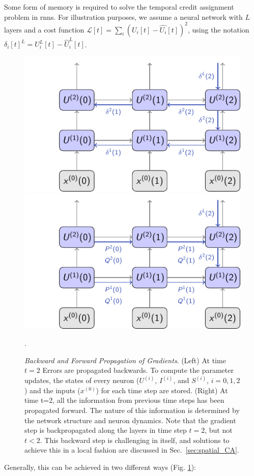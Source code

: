 \documentclass[journal,onecolumn,11pt]{IEEEtran}
\begin{document}
\label{sec:temporal_credit_assignment}
Some form of memory is required to solve the temporal credit assignment problem in \glspl{rnn}. 
For illustration purposes, we assume a neural network with $L$ layers and a cost function $\mathcal{L}[t] = \sum_i (U_i[t]-\hat{U_i}[t])^2$, using the notation $\delta_i[t]^{L} = U_i^L[t]-\hat{U}_i^L[t]$. 
%
\begin{figure}[htbp]
    \centering
    \includegraphics[width=.4\textwidth]{figures/diagram_bp}
    \hspace{.1em}
    \includegraphics[width=.4\textwidth]{figures/diagram_rtrl}
  \caption{\emph{Backward and Forward Propagation of Gradients}. (Left) At time $t=2$ Errors are propagated backwards. To compute the parameter updates, the states of every neuron ($U^{(i)}$, $I^{(i)}$, and $S^{(i)}$, $i=0,1,2$) and the inputs ($x^{(0)}$) for each time step are stored. (Right) At time t=2, all the information from previous time steps has been propagated forward. The nature of this information is determined by the network structure and neuron dynamics. Note that the gradient step is backpropagated along the layers in time step $t=2$, but not $t<2$. This backward step is challenging in itself, and solutions to achieve this in a local fashion are discussed in Sec.~\ref{sec:spatial_CA}.
}. 
    \label{fig:backwrd_vs_forward_prop}
\end{figure}
%
Generally, this can be achieved in two different ways \cite{Williams_Zipser89_learalgo} (Fig. \ref{fig:backwrd_vs_forward_prop}):
\end{document}
